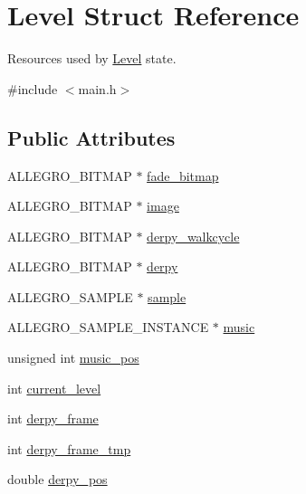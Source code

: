 \hypertarget{structLevel}{\section{\-Level \-Struct \-Reference}
\label{structLevel}
}


\-Resources used by \hyperlink{structLevel}{\-Level} state.  




{\ttfamily \#include $<$main.\-h$>$}

\subsection*{\-Public \-Attributes}
\begin{DoxyCompactItemize}
\item 
\-A\-L\-L\-E\-G\-R\-O\-\_\-\-B\-I\-T\-M\-A\-P $\ast$ \hyperlink{structLevel_a1a9629222f6536790772ad7af5d2413c}{fade\-\_\-bitmap}
\item 
\-A\-L\-L\-E\-G\-R\-O\-\_\-\-B\-I\-T\-M\-A\-P $\ast$ \hyperlink{structLevel_a29a3fe4b6d80ae62843840aa6afa0596}{image}
\item 
\-A\-L\-L\-E\-G\-R\-O\-\_\-\-B\-I\-T\-M\-A\-P $\ast$ \hyperlink{structLevel_ab6a78c50cda8424f722ca249f5466f67}{derpy\-\_\-walkcycle}
\item 
\-A\-L\-L\-E\-G\-R\-O\-\_\-\-B\-I\-T\-M\-A\-P $\ast$ \hyperlink{structLevel_ae33832497116b7a0c184959bbde21ee5}{derpy}
\item 
\-A\-L\-L\-E\-G\-R\-O\-\_\-\-S\-A\-M\-P\-L\-E $\ast$ \hyperlink{structLevel_a234fa7b9ec35dd360e4e3c48a944fc7d}{sample}
\item 
\-A\-L\-L\-E\-G\-R\-O\-\_\-\-S\-A\-M\-P\-L\-E\-\_\-\-I\-N\-S\-T\-A\-N\-C\-E $\ast$ \hyperlink{structLevel_a41c6aae8f508e078b02c291e1d6f8e67}{music}
\item 
unsigned int \hyperlink{structLevel_a13e322deb3298846260af31324e5b492}{music\-\_\-pos}
\item 
int \hyperlink{structLevel_a1ba3ee0104c912dde5d6e70fee889512}{current\-\_\-level}
\item 
int \hyperlink{structLevel_aab3e7d9746c741ce8e1a76df13be7c53}{derpy\-\_\-frame}
\item 
int \hyperlink{structLevel_aa6a30e7b31e2300936f8e97890e1817c}{derpy\-\_\-frame\-\_\-tmp}
\item 
double \hyperlink{structLevel_a2bc3affc5c71ac8f6b9b775cefac0444}{derpy\-\_\-pos}
\end{DoxyCompactItemize}


